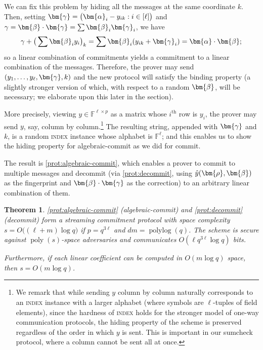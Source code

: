 \documentclass[10pt,a4paper]{article}
\newtheorem{theorem}{Theorem}[section]
\theoremstyle{definition}
\newcommand{\field}{\mathbb{F}}
\newcommand{\poly}{\operatorname{poly}}
\newcommand{\polylog}{\operatorname{polylog}}
\newcommand{\indexproblem}{\normalfont\textsc{index}\xspace}
\newcommand{\pcommitlength}{p}
\newcommand{\pcommitstring}{y}
\newcommand{\dimension}{m}
\newcommand{\degree}{d}
\newcommand{\fieldsize}{q}
\newcommand{\evaluationpoint}{\bm{\fe2}}
\newcommand{\fingerprinttuple}{\bm{\rho}}
\def\fe#1{
    \ifnum#1=1
        \alpha
    \else
    \ifnum#1=2
        \beta
    \else
    \ifnum#1=3
        \gamma
    \fi\fi\fi
}
\begin{document}
We can fix this problem by hiding all the messages at the same coordinate $k$. Then, setting $\bm{\fe3} = \big(\bm{\fe1}_i - \pcommitstring_{ik} : i \in [\ell]\big)$ and $\fe3 = \bm{\fe2} \cdot \bm{\fe3} = \sum \bm{\fe2}_i \bm{\fe3}_i$, we have
\begin{equation*}
    \fe3 + \big(\sum \evaluationpoint_i \pcommitstring_i\big)_k = \sum \evaluationpoint_i (\pcommitstring_{ik} + \bm{\fe3}_i) = \bm{\fe1} \cdot \evaluationpoint;
\end{equation*}
so a linear combination of commitments yields a commitment to a linear combination of the messages. Therefore, the prover may send $(\pcommitstring_1, \ldots, \pcommitstring_\ell, \bm{\fe3}, k)$ and the new protocol will satisfy the binding property (a slightly stronger version of which, with respect to a random $\evaluationpoint$, will be necessary; we elaborate upon this later in the section).

More precisely, viewing $\pcommitstring \in \field^{\ell \times \pcommitlength}$ as a matrix whose $i^\text{th}$ row is $\pcommitstring_i$, the prover may send $\pcommitstring$, say, column by column.\footnote{We remark that while sending $\pcommitstring$ column by column naturally corresponds to an \indexproblem instance with a larger alphabet (where symbols are $\ell$-tuples of field elements), since the hardness of \indexproblem holds for the stronger model of one-way communication protocols, the hiding property of the scheme is preserved regardless of the order in which $\pcommitstring$ is sent. This is important in our sumcheck protocol, where a column cannot be sent all at once.} The resulting string, appended with $\bm{\fe3}$ and $k$, is a random \indexproblem instance whose alphabet is $\field^\ell$; and this enables us to show the hiding property for \textsf{algebraic-commit} as we did for \textsf{commit}.

The result is \cref{prot:algebraic-commit}, which enables a prover to commit to multiple messages and decommit (via \cref{prot:decommit}, using $\hat \pcommitstring(\fingerprinttuple, \bm{\fe2})$ as the fingerprint and $\bm{\fe2} \cdot \bm{\fe3}$ as the correction) to an arbitrary linear combination of them.


\begin{theorem}
    \label{thm:pv-algebraic-commitment}
    \cref{prot:algebraic-commit} (\textsf{algebraic-commit}) and \cref{prot:decommit} (\textsf{decommit}) form a streaming commitment protocol with space complexity $s = O\big((\ell + \dimension) \log \fieldsize\big)$ if $\pcommitlength = \fieldsize^{3\ell}$ and $\degree \dimension = \polylog(\fieldsize)$. The scheme is secure against $\poly(s)$-space adversaries and communicates $O(\ell \fieldsize^{3 \ell} \log \fieldsize)$ bits.
    
    Furthermore, if each linear coefficient can be computed in $O(\dimension \log \fieldsize)$ space, then $s = O(\dimension \log \fieldsize)$.
\end{theorem}
\end{document}
